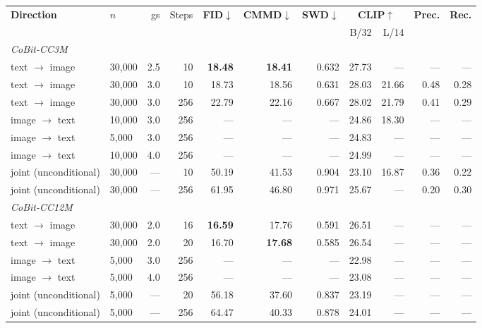 \begin{table}[tb]
\centering
\footnotesize
\setlength{\tabcolsep}{3.5pt}
\begin{tabular}{llrrrrrrrrr}
\toprule
\textbf{Direction} & $n$ & gs & Steps & \textbf{FID}$\downarrow$ & \textbf{CMMD}$\downarrow$ & \textbf{SWD}$\downarrow$
& \multicolumn{2}{c}{\textbf{CLIP}$\uparrow$} & \textbf{Prec.} & \textbf{Rec.} \\
\cmidrule(lr){8-9}
& & & & & & & B/32 & L/14 & & \\
\midrule
\multicolumn{11}{l}{\emph{CoBit-CC3M}}\\
text $\rightarrow$ image & 30{,}000 & 2.5 & 10 & \textbf{18.48} & \textbf{18.41} & 0.632 & 27.73 & --- & --- & --- \\
text $\rightarrow$ image & 30{,}000 & 3.0 & 10 & 18.73 & 18.56 & 0.631 & 28.03 & 21.66 & 0.48 & 0.28 \\
text $\rightarrow$ image & 30{,}000 & 3.0 & 256 & 22.79 & 22.16 & 0.667 & 28.02 & 21.79 & 0.41 & 0.29 \\
image $\rightarrow$ text & 10{,}000 & 3.0 & 256 & --- & --- & --- & 24.86 & 18.30 & --- & --- \\
image $\rightarrow$ text & 5{,}000 & 3.0 & 256 & --- & --- & --- & 24.83 & --- & --- & --- \\
image $\rightarrow$ text & 10{,}000 & 4.0 & 256 & --- & --- & --- & 24.99 & --- & --- & --- \\
joint (unconditional) & 30{,}000 & --- & 10 & 50.19 & 41.53 & 0.904 & 23.10 & 16.87 & 0.36 & 0.22 \\
joint (unconditional) & 30{,}000 & --- & 256 & 61.95 & 46.80 & 0.971 & 25.67 & --- & 0.20 & 0.30 \\
\midrule
\multicolumn{11}{l}{\emph{CoBit-CC12M}}\\
text $\rightarrow$ image & 30{,}000 & 2.0 & 16 & \textbf{16.59} & 17.76 & 0.591 & 26.51 & --- & --- & --- \\
text $\rightarrow$ image & 30{,}000 & 2.0 & 20 & 16.70 & \textbf{17.68} & 0.585 & 26.54 & --- & --- & --- \\
image $\rightarrow$ text & 5{,}000 & 3.0 & 256 & --- & --- & --- & 22.98 & --- & --- & --- \\
image $\rightarrow$ text & 5{,}000 & 4.0 & 256 & --- & --- & --- & 23.08 & --- & --- & --- \\
joint (unconditional) & 5{,}000 & --- & 20 & 56.18 & 37.60 & 0.837 & 23.19 & --- & --- & --- \\
joint (unconditional) & 5{,}000 & --- & 256 & 64.47 & 40.33 & 0.878 & 24.01 & --- & --- & --- \\

\end{tabular}
\end{table}
